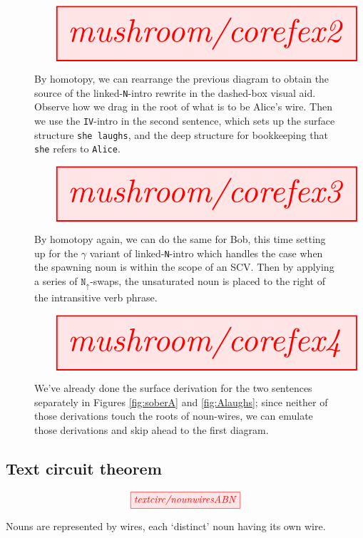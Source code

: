 \begin{figure}[h!]\label{fig:corefex2}
\centering
\[
\resizebox{\textwidth}{!}{\tikzfig{mushroom/corefex2}}
\]
\caption{By homotopy, we can rearrange the previous diagram to obtain the source of the linked-\texttt{N}-intro rewrite in the dashed-box visual aid. Observe how we drag in the root of what is to be Alice's wire. Then we use the \texttt{IV}-intro in the second sentence, which sets up the surface structure \texttt{she laughs}, and the deep structure for bookkeeping that \texttt{she} refers to \texttt{Alice}.}
\end{figure}

\begin{figure}[h!]\label{fig:corefex3}
\centering
\[
\resizebox{\textwidth}{!}{\tikzfig{mushroom/corefex3}}
\]
\caption{By homotopy again, we can do the same for Bob, this time setting up for the $\gamma$ variant of linked-\texttt{N}-intro which handles the case when the spawning noun is within the scope of an SCV. Then by applying a series of $\texttt{N}_\uparrow$-swaps, the unsaturated noun is placed to the right of the intransitive verb phrase.}
\end{figure}

\begin{figure}[h!]\label{fig:corefex4}
\centering
\[
\resizebox{\textwidth}{!}{\tikzfig{mushroom/corefex4}}
\]
\caption{We've already done the surface derivation for the two sentences separately in Figures \ref{fig:soberA} and \ref{fig:Alaughs}; since neither of those derivations touch the roots of noun-wires, we can emulate those derivations and skip ahead to the first diagram. }
\end{figure}

\newpage

\subsection{Text circuit theorem}


\begin{marginfigure}
\centering
\[
\tikzfig{textcirc/nounwiresABN} 
\]
\caption{Nouns are represented by wires, each `distinct' noun having its own wire.}
\end{marginfigure}

